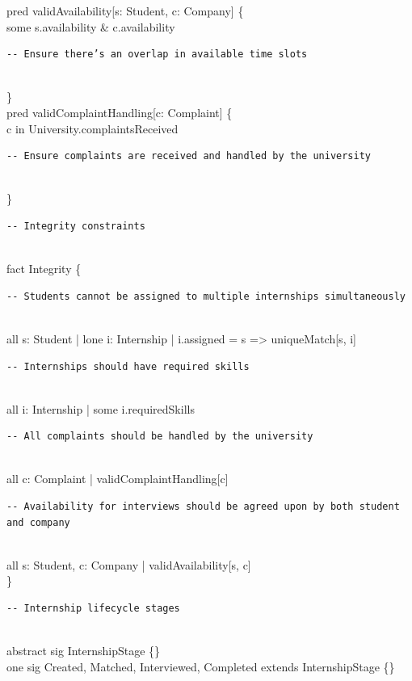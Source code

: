 pred validAvailability[s: Student, c: Company] \{ \\
  some s.availability \& c.availability \begin{verbatim}
-- Ensure there’s an overlap in available time slots
\end{verbatim}\\
\} \\

pred validComplaintHandling[c: Complaint] \{ \\
  c in University.complaintsReceived \begin{verbatim}
-- Ensure complaints are received and handled by the university
\end{verbatim}\\
\} \\

\begin{verbatim}
-- Integrity constraints
\end{verbatim}\\
fact Integrity \{ \\
  \begin{verbatim}
-- Students cannot be assigned to multiple internships simultaneously
\end{verbatim}\\
  all s: Student | lone i: Internship | i.assigned = s => uniqueMatch[s, i] \\

  \begin{verbatim}
-- Internships should have required skills
\end{verbatim}\\
  all i: Internship | some i.requiredSkills \\

  \begin{verbatim}
-- All complaints should be handled by the university
\end{verbatim}\\
  all c: Complaint | validComplaintHandling[c] \\

  \begin{verbatim}
-- Availability for interviews should be agreed upon by both student and company
\end{verbatim}\\
  all s: Student, c: Company | validAvailability[s, c] \\
\} \\

\begin{verbatim}
-- Internship lifecycle stages
\end{verbatim}\\
abstract sig InternshipStage \{\} \\
one sig Created, Matched, Interviewed, Completed extends InternshipStage \{\} \\

